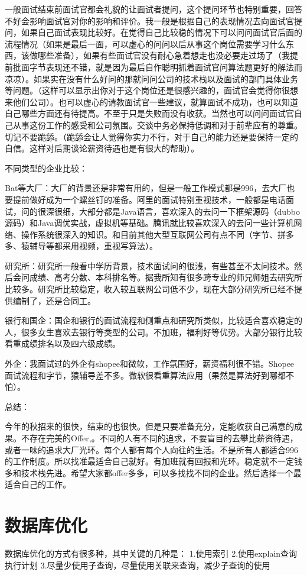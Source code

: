 \documentclass[UTF8]{ctexart}
\begin{document}
一般面试结束前面试官都会礼貌的让面试者提问，这个提问环节也特别重要，回答不好会影响面试官对你的影响和评价。我一般是根据自己的表现情况去向面试官提问，如果自己面试表现比较好。在觉得自己比较稳的情况下可以问问面试官后面的流程情况（如果是最后一面，可以虚心的问问以后从事这个岗位需要学习什么东西，该做哪些准备），如果有些面试官没有耐心急着想走也没必要走过场了（我提前批面字节表现还不错，就是因为最后自作聪明抓着面试官问算法题更好的解法而凉凉）。如果实在没有什么好问的那就问问公司的技术栈以及面试的部门具体业务等问题。（这样可以显示出你对于这个岗位还是很感兴趣的，面试官会觉得你很想来他们公司）。也可以虚心的请教面试官一些建议，就算面试不成功，也可以知道自己哪些方面还有待提高。不至于只是失败而没有收获。当然也可以问问面试官自己从事这份工作的感受和公司氛围。交谈中务必保持低调和对于前辈应有的尊重。切记不要跪舔。（跪舔会让人觉得你实力不行，对于自己的能力还是要保持一定的自信。这样对后期谈论薪资待遇也是有很大的帮助）。

不同类型的企业比较：

Bat等大厂：大厂的背景还是非常有用的，但是一般工作模式都是996，去大厂也要提前做好成为一个螺丝钉的准备。阿里的面试特别重视技术，一般都是电话面试，问的很深很细，大部分都是Java语言，喜欢深入的去问一下框架源码（dubbo源码）和Java调优实战，虚拟机等基础。腾讯就比较喜欢深入的去问一些计算机网络、操作系统很深入的知识。和目前其他大型互联网公司有点不同（字节、拼多多、猿辅导等都采用视频，重视写算法）。

研究所：研究所一般看中学历背景，技术面试问的很浅，有些甚至不太问技术。然后会问成绩、高考分数、本科排名等。据我所知有很多跨专业的师兄师姐去研究所比较多。研究所比较稳定，收入较互联网公司低不少，现在大部分研究所已经不提供编制了，还是合同工。

银行和国企：国企和银行的面试流程和侧重点和研究所类似，比较适合喜欢稳定的人，很多女生喜欢去银行等类型的公司。不加班，福利好等优势。大部分银行比较看重成绩排名以及四六级成绩。

外企：我面试过的外企有shopee和微软，工作氛围好，薪资福利很不错。Shopee面试流程和字节，猿辅导差不多。微软很看重算法应用（果然是算法好到哪都不怕）。

总结：

今年的秋招来的很快，结束的也很快。但是只要准备充分，定能收获自己满意的成果。不存在完美的Offer,。不同的人有不同的追求，不要盲目的去攀比薪资待遇，或者一味的追求大厂光环。每个人都有每个人向往的生活。不是所有人都适合996的工作制度。所以找准最适合自己就好。有加班就有回报和光环。稳定就不一定钱多和技术栈先进。希望大家都offer多多，可以多找找不同的企业。然后选择一个最适合自己的工作。


\section{数据库优化}
数据库优化的方式有很多种，其中关键的几种是：
1.使用索引
2.使用explain查询执行计划
3.尽量少使用子查询，尽量使用关联来查询，减少子查询的使用
\end{document}
